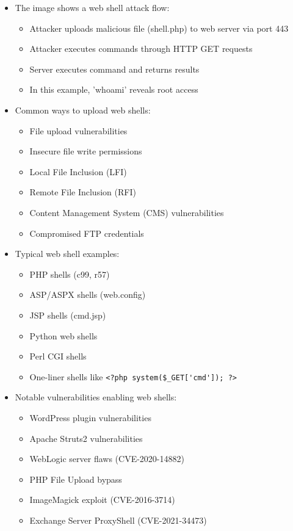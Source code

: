 \begin{itemize}
	\item The image shows a web shell attack flow:
    \begin{itemize}
        \tightlist
		\item Attacker uploads malicious file (shell.php) to web server via port 443
		\item Attacker executes commands through HTTP GET requests
		\item Server executes command and returns results
		\item In this example, 'whoami' reveals root access
    \end{itemize}

	\item Common ways to upload web shells:
    \begin{itemize}
        \tightlist
		\item File upload vulnerabilities
		\item Insecure file write permissions
		\item Local File Inclusion (LFI)
		\item Remote File Inclusion (RFI)
		\item Content Management System (CMS) vulnerabilities
		\item Compromised FTP credentials
    \end{itemize}

	\item Typical web shell examples:
    \begin{itemize}
        \tightlist
		\item PHP shells (c99, r57)
		\item ASP/ASPX shells (web.config)
		\item JSP shells (cmd.jsp)
		\item Python web shells
		\item Perl CGI shells
		\item One-liner shells like \lstinline{<?php system($_GET['cmd']); ?>}
    \end{itemize}

	\item Notable vulnerabilities enabling web shells:
    \begin{itemize}
        \tightlist
		\item WordPress plugin vulnerabilities
		\item Apache Struts2 vulnerabilities
		\item WebLogic server flaws (CVE-2020-14882)
		\item PHP File Upload bypass
		\item ImageMagick exploit (CVE-2016-3714)
		\item Exchange Server ProxyShell (CVE-2021-34473)
    \end{itemize}


\end{itemize}
